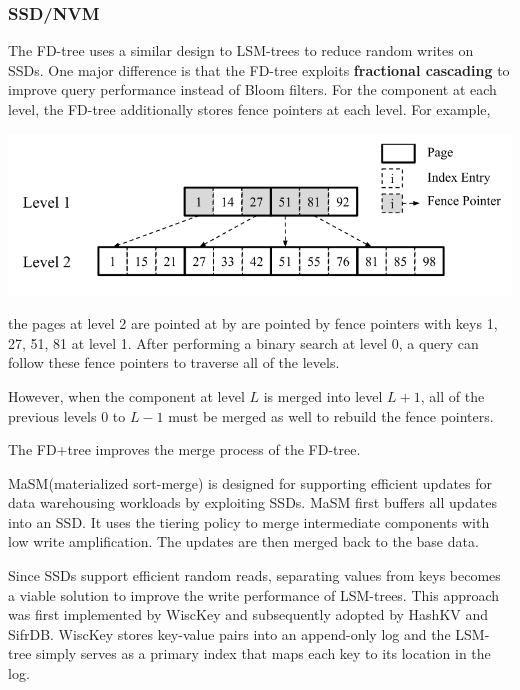 \documentclass[11pt]{article}
\begin{document}
\subsubsection{SSD/NVM}
\label{sec:org9322926}
The FD-tree uses a similar design to LSM-trees to reduce random writes on SSDs. One major difference
is that the FD-tree exploits \textbf{fractional cascading}\cite{10.1007/BF01840440} to improve query performance
instead of Bloom filters.
For the component at each level, the FD-tree additionally stores fence pointers at each level. For
example,
\begin{center}
\includegraphics[width=.8\textwidth]{../../images/db/12.png}
\end{center}
the pages at level 2 are pointed at by are pointed by fence pointers with keys 1, 27, 51, 81 at
level 1. After performing a binary search at level 0, a query can follow these fence pointers to
traverse all of the levels.

However, when the component at level \(L\) is merged into level \(L+1\), all of the previous levels 0
to \(L-1\) must be merged as well to rebuild the fence pointers.

The FD+tree improves the merge process of the FD-tree.

MaSM(materialized sort-merge) is designed for supporting efficient updates for data warehousing
workloads by exploiting SSDs. MaSM first buffers all updates into an SSD. It uses the tiering policy
to merge intermediate components with low write amplification. The updates are then merged back to the
base data.

Since SSDs support efficient random reads, separating values from keys becomes a viable solution to
improve the write performance of LSM-trees. This approach was first implemented by WiscKey and
subsequently adopted by HashKV and SifrDB. WiscKey stores key-value pairs into an append-only log and
the LSM-tree simply serves as a primary index that maps each key to its location in the log.
\end{document}
